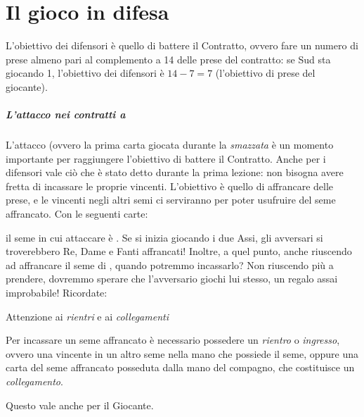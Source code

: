 \documentclass[../corsofiori.tex]{subfiles}
\begin{document}
\setcounter{chapter}{1}
\setcounter{regolactr}{2}
\chapter{Il gioco in difesa}

L'obiettivo dei difensori è quello di battere il Contratto, ovvero fare un numero di prese almeno pari al complemento a
14 delle prese del contratto: se Sud sta giocando 1\SA, l'obiettivo dei difensori è $14 - 7 = 7$ (l'obiettivo di prese del
giocante).

\paragraph{L'attacco nei contratti a \SA}

L'attacco (ovvero la prima carta giocata durante la \emph{smazzata} è un momento importante per raggiungere l'obiettivo di battere il
Contratto.
Anche per i difensori vale ciò che è stato detto durante la prima lezione: non bisogna avere fretta di incassare le
proprie vincenti. L'obiettivo è quello di affrancare delle prese, e le vincenti negli altri semi ci serviranno per poter
usufruire del seme affrancato.
Con le seguenti carte:
\begin{center}
\end{center}
il seme in cui attaccare è \fio. Se si inizia giocando i due Assi, gli avversari si troverebbero Re, Dame e Fanti
affrancati! Inoltre, a quel punto, anche riuscendo ad affrancare il seme di \fio, quando potremmo incassarlo? Non
riuscendo più a prendere, dovremmo sperare che l'avversario giochi \fio lui stesso, un regalo assai improbabile!
Ricordate:

\medskip
\begin{attenzione}{Attenzione ai \emph{rientri} e ai \emph{collegamenti}}

    Per incassare un seme affrancato è necessario possedere un \emph{rientro} o \emph{ingresso}, ovvero una vincente in un altro seme
    nella mano che possiede il seme, oppure una carta del seme affrancato posseduta dalla mano del compagno, che
    costituisce un \emph{collegamento}.

\end{attenzione}

\medskip

Questo vale anche per il Giocante.
\end{document}
